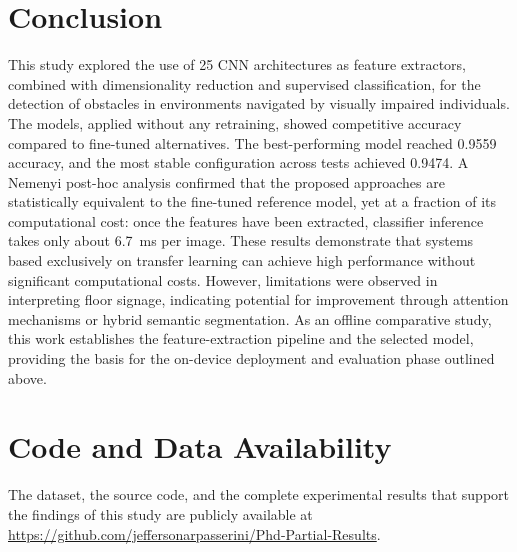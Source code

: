 \documentclass[final,5p,times,twocolumn]{elsarticle}
\begin{document}
\section{Conclusion}
This study explored the use of 25 CNN architectures as feature extractors, combined with dimensionality reduction and supervised classification, for the detection of obstacles in environments navigated by visually impaired individuals. The models, applied without any retraining, showed competitive accuracy compared to fine-tuned alternatives. The best-performing model reached 0.9559 accuracy, and the most stable configuration across tests achieved 0.9474. A Nemenyi post-hoc analysis confirmed that the proposed approaches are statistically equivalent to the fine-tuned reference model, yet at a fraction of its computational cost: once the features have been extracted, classifier inference takes only about 6.7~ms per image. These results demonstrate that systems based exclusively on transfer learning can achieve high performance without significant computational costs. However, limitations were observed in interpreting floor signage, indicating potential for improvement through attention mechanisms or hybrid semantic segmentation. As an offline comparative study, this work establishes the feature-extraction pipeline and the selected model, providing the basis for the on-device deployment and evaluation phase outlined above.

\section*{Code and Data Availability}
The dataset, the source code, and the complete experimental results that support the findings of this study are publicly available at \url{https://github.com/jeffersonarpasserini/Phd-Partial-Results}.




\end{document}
